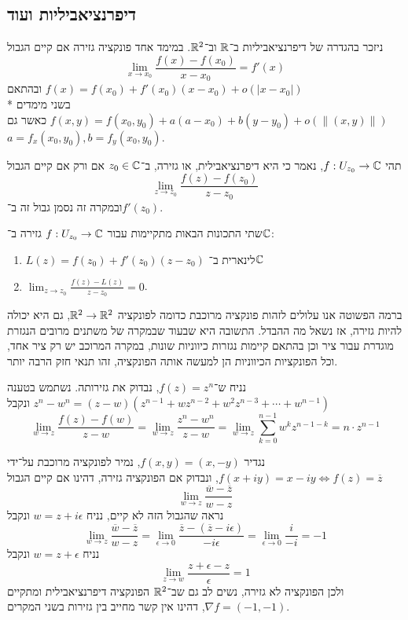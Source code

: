 \subsection{דיפרנציאביליות ועוד}
ניזכר בהגדרה של דיפרנציאביליות ב־$\mathbb{R}$ וב־$\mathbb{R}^2$.
במימד אחד פונקציה גזירה אם קיים הגבול
\[
	\lim_{x \to x_0} \frac{f(x) - f(x_0)}{x - x_0} = f'(x)
\]
ובהתאם $f(x) = f(x_0) + f'(x_0)(x - x_0) + o(|x - x_0|)$ \\*
בשני מימדים $f(x, y) = f(x_0, y_0) + a(a - x_0) + b(y - y_0) + o(\lVert (x, y) \rVert)$ כאשר גם $a = f_x(x_0, y_0), b = f_y(x_0, y_0)$.
\begin{definition}
	תהי $f : U_{z_0} \to \mathbb{C}$, נאמר כי היא דיפרנציאבילית, או גזירה, ב־$z_0 \in \mathbb{C}$ אם ורק אם קיים הגבול
	\[
		\lim_{z \to z_0} \frac{f(z) - f(z_0)}{z - z_0}
	\]
	ובמקרה זה נסמן גבול זה ב־$f'(z_0)$.
\end{definition}
\begin{proposition}
	שתי התכונות הבאות מתקיימות עבור $f : U_{z_0} \to \mathbb{C}$ גזירה ב־$\mathbb{C}$:
	\begin{enumerate}
		\item $L(z) = f(z_0) + f'(z_0)(z - z_0)$ לינארית ב־$\mathbb{C}$
		\item $\lim_{z \to z_0} \frac{f(z) - L(z)}{z - z_0} = 0$.
	\end{enumerate}
\end{proposition}
ברמה הפשוטה אנו עלולים לזהות פונקציה מרוכבת כדומה לפונקציה $\mathbb{R}^2 \to \mathbb{R}^2$, גם היא יכולה להיות גזירה, אז נשאל מה ההבדל.
התשובה היא שבעוד שבמקרה של משתנים מרובים הנגזרת מוגדרת עבור ציר וכן בהתאם קיימות נגזרות כיווניות שונות, במקרה המרוכב יש רק ציר אחד, וכל הפונקציות הכיווניות הן למעשה אותה הפונקציה, זהו תנאי חזק הרבה יותר.
\begin{example}
	נניח ש־$f(z) = z^n$, נבדוק את גזירותה.
	נשתמש בטענה $z^n - w^n = (z - w)(z^{n - 1} + wz^{n - 2} + w^2 z^{n - 3} + \cdots + w^{n - 1})$ ונקבל
	\[
		\lim_{w \to z} \frac{f(z) - f(w)}{z - w}
		= \lim_{w \to z} \frac{z^n - w^n}{z - w}
		= \lim_{w \to z} \sum_{k = 0}^{n - 1} w^k z^{n - 1 - k}
		= n \cdot z^{n - 1}
	\]
\end{example}
\begin{example}
	נגדיר $f(x, y) = (x, -y)$, נמיר לפונקציה מרוכבת על־ידי $f(x + iy) = x - iy \iff f(z) = \overline{z}$, ונבדוק אם הפונקציה גזירה, דהינו אם קיים הגבול
	\[
		\lim_{w \to z} \frac{\overline{w} - \overline{z}}{w - z}
	\]
	נראה שהגבול הזה לא קיים, נניח $w = z + i \epsilon$ ונקבל
	\[
		\lim_{w \to z} \frac{\overline{w} - \overline{z}}{w - z}
		= \lim_{\epsilon \to 0} \frac{\overline{z} - (\overline{z} - i \epsilon)}{-i\epsilon}
		= \lim_{\epsilon \to 0} \frac{i}{-i} = -1
	\]
	נניח $w = z + \epsilon$ ונקבל
	\[
		\lim_{z \to w} \frac{z + \epsilon - z}{\epsilon} = 1
	\]
	ולכן הפונקציה לא גזירה, נשים לב גם שב־$\mathbb{R}^2$ הפונקציה דיפרנציאבילית ומתקיים $\nabla f = (-1, -1)$, דהינו אין קשר מחייב בין גזירות בשני המקרים.
\end{example}
